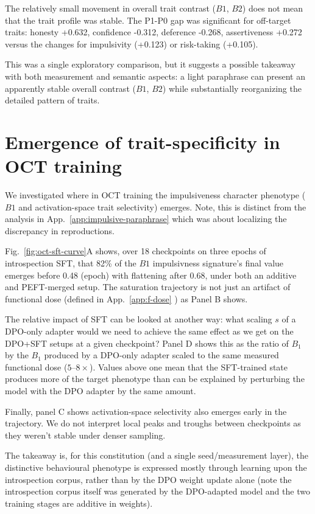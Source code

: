 \documentclass{article}
\begin{document}
The relatively small movement in overall trait contrast ($B1$, $B2$) does not mean that the trait profile was stable. The P1-P0 gap was significant for off-target traits: honesty +0.632, confidence -0.312, deference -0.268, assertiveness +0.272 versus the changes for impulsivity (+0.123) or risk-taking (+0.105).

This was a single exploratory comparison, but it suggests a possible takeaway with both measurement and semantic aspects: a light paraphrase can present an apparently stable overall contrast ($B1$, $B2$) while substantially reorganizing the detailed pattern of traits.


\section{Emergence of trait-specificity in OCT training}
\label{sec:oct-stage}

We investigated where in OCT training the impulsiveness character phenotype ($B1$ and activation-space trait selectivity) emerges. Note, this is distinct from the analysis in App.~\ref{app:impulsive-paraphrase} which was about localizing the discrepancy in reproductions. 

Fig.~\ref{fig:oct-sft-curve}A shows, over 18 checkpoints on three epochs of introspection SFT, that 82\% of the $B1$ impulsivness signature's final value emerges before 0.48 (epoch) with flattening after 0.68, under both an additive and PEFT-merged setup. The saturation trajectory is not just an artifact of functional dose (defined in App.~\ref{app:f-dose}
) as Panel B shows. 

The relative impact of SFT can be looked at another way: what scaling $s$ of a DPO-only adapter would we need to achieve the same effect as we get on the DPO+SFT setups at a given checkpoint? Panel D shows this as the ratio of $B_1$ by the $B_1$ produced by a DPO-only adapter scaled to the same measured functional dose ($5$--$8\times$). Values above one mean that the SFT-trained state produces more of the target phenotype than can be explained by perturbing the model with the DPO adapter by the same amount.

Finally, panel C shows activation-space selectivity also emerges early in the trajectory. We do not interpret local peaks and troughs between checkpoints as they weren't stable under denser sampling. 

The takeaway is, for this constitution (and a single seed/measurement layer), the distinctive behavioural phenotype is expressed mostly through learning upon the introspection corpus, rather than by the DPO weight update alone (note the introspection corpus itself was generated by the DPO-adapted model and the two training stages are additive in weights).
\end{document}
